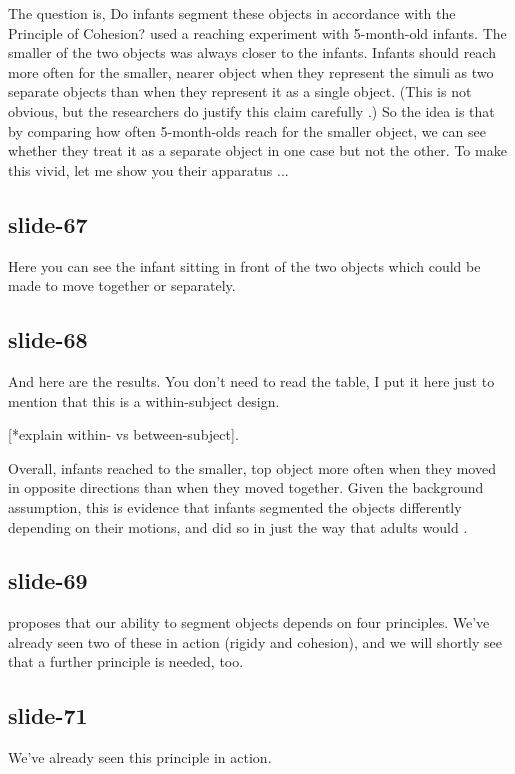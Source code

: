 \documentclass[12pt,\papersize]{extarticle}
\begin{document}
The question is, Do infants segment these objects in accordance with the Principle of Cohesion?
\citet[Experiment 2]{spelke:1989_reaching} used a reaching experiment with 5-month-old infants.
The smaller of the two objects was always closer to the infants.  
Infants should reach more often for the smaller, nearer object when they represent the simuli 
as two separate objects than when they represent it as a single object.
(This is not obvious, but the researchers do justify this claim carefully 
\citep[p.\ 186]{spelke:1989_reaching}.)
So the idea is that by comparing how often 5-month-olds reach for the smaller object, we can
see whether they treat it as a separate object in one case but not the other.
To make this vivid, let me show you their apparatus ...
 
\subsection{slide-67}
Here you can see the infant sitting in front of the two objects which could be made to move
together or separately.
 
\subsection{slide-68}
And here are the results.  You don't need to read the table, I put it here just to mention
that this is a within-subject design.

[*explain within- vs between-subject].

Overall, infants reached to the smaller, top object more often when they moved in opposite 
directions than when they moved together.
Given the background assumption, this is evidence that infants segmented the objects 
differently depending on their motions, and did so in just the way that adults would
\citep[Experiment 2]{spelke:1989_reaching}.
 
\subsection{slide-69}
\citet{Spelke:1990jn} proposes that our ability to segment objects depends on four principles.
We've already seen two of these in action (rigidy and cohesion), and we will shortly see 
that a further principle is needed, too.
 
\subsection{slide-71}
We've already seen this principle in action.
 
\end{document}
